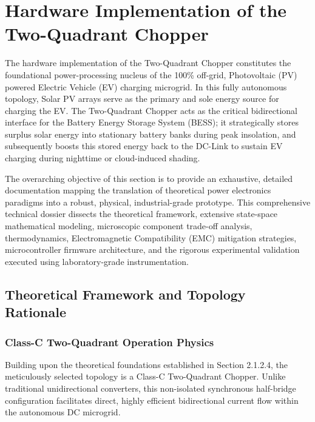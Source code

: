 \section{Hardware Implementation of the Two-Quadrant Chopper}

The hardware implementation of the Two-Quadrant Chopper constitutes the foundational power-processing nucleus of the 100\% off-grid, Photovoltaic (PV) powered Electric Vehicle (EV) charging microgrid. In this fully autonomous topology, Solar PV arrays serve as the primary and sole energy source for charging the EV. The Two-Quadrant Chopper acts as the critical bidirectional interface for the Battery Energy Storage System (BESS); it strategically stores surplus solar energy into stationary battery banks during peak insolation, and subsequently boosts this stored energy back to the DC-Link to sustain EV charging during nighttime or cloud-induced shading.

The overarching objective of this section is to provide an exhaustive, detailed documentation mapping the translation of theoretical power electronics paradigms into a robust, physical, industrial-grade prototype. This comprehensive technical dossier dissects the theoretical framework, extensive state-space mathematical modeling, microscopic component trade-off analysis, thermodynamics, Electromagnetic Compatibility (EMC) mitigation strategies, microcontroller firmware architecture, and the rigorous experimental validation executed using laboratory-grade instrumentation.

\subsection{Theoretical Framework and Topology Rationale}

\subsubsection{Class-C Two-Quadrant Operation Physics}
Building upon the theoretical foundations established in Section 2.1.2.4, the meticulously selected topology is a Class-C Two-Quadrant Chopper. Unlike traditional unidirectional converters, this non-isolated synchronous half-bridge configuration facilitates direct, highly efficient bidirectional current flow within the autonomous DC microgrid. 

